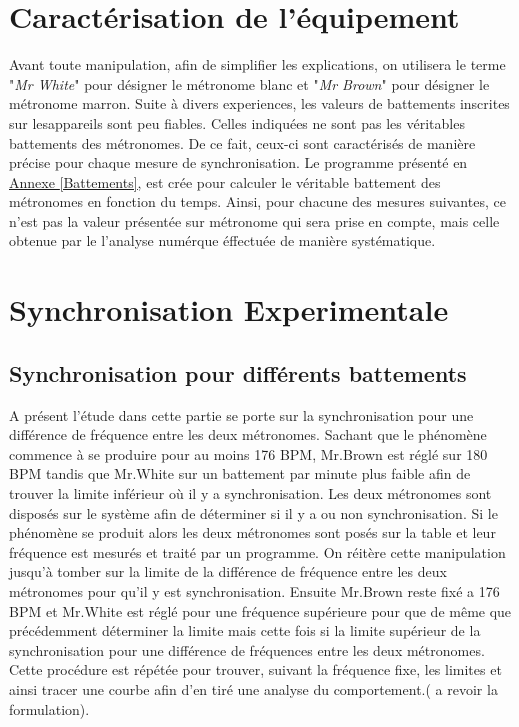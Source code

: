 \documentclass[a4paper,11pt]{report}
\begin{document}
\section{Caractérisation de l'équipement}
Avant toute manipulation, afin de simplifier les explications, on utilisera le terme "{\it Mr White}" pour désigner le métronome blanc et "{\it Mr Brown}" pour désigner le métronome marron. Suite à divers experiences, les valeurs de battements inscrites sur lesappareils sont peu fiables. Celles indiquées ne sont pas les véritables battements des métronomes. De ce fait, ceux-ci sont caractérisés de manière précise pour chaque mesure de synchronisation. Le programme présenté en \underline{Annexe \ref{Battements}}, est crée pour calculer le véritable battement des métronomes en fonction du temps. Ainsi, pour chacune des mesures suivantes, ce n'est pas la valeur présentée sur métronome qui sera prise en compte, mais celle obtenue par le l'analyse numérque éffectuée de manière systématique.

\section{Synchronisation Experimentale}

\subsection{Synchronisation pour différents battements}
	A présent l'étude dans cette partie se porte sur la synchronisation pour une différence de fréquence entre les deux métronomes. Sachant que le phénomène commence à se produire pour au moins 176 BPM, Mr.Brown est réglé sur 180 BPM tandis que Mr.White sur un battement par minute plus faible afin de trouver la limite inférieur où il y a synchronisation. Les deux métronomes sont disposés sur le système afin de déterminer si il y a ou non synchronisation. Si le phénomène se produit alors les deux métronomes sont posés sur la table et leur fréquence est mesurés et traité par un programme. On réitère cette manipulation jusqu'à tomber sur la limite de la différence de fréquence entre les deux métronomes pour qu'il y est synchronisation.   Ensuite Mr.Brown reste fixé a 176 BPM et Mr.White est réglé pour une fréquence supérieure pour que de même que précédemment déterminer la limite mais cette fois si la limite supérieur de la synchronisation pour une différence de fréquences entre les deux métronomes. Cette procédure est répétée pour trouver, suivant la fréquence fixe, les limites et ainsi tracer une courbe afin d'en tiré une analyse du comportement.( a revoir la formulation). 
	
\end{document}
